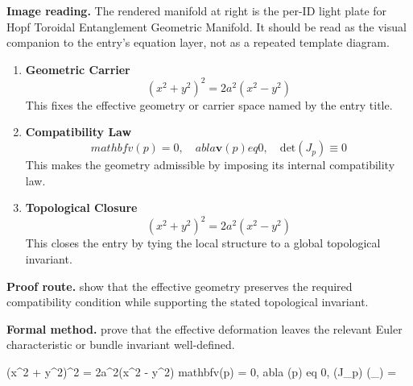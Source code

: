 \begin{samepage}
\noindent\begin{minipage}[t]{0.45\linewidth}
\vspace{0pt}
\raggedright
\scriptsize\textbf{Image reading.} The rendered manifold at right is the per-ID light plate for Hopf Toroidal Entanglement Geometric Manifold. It should be read as the visual companion to the entry's equation layer, not as a repeated template diagram.\par
\end{minipage}\hfill
\begin{minipage}[t]{0.53\linewidth}
\vspace*{-0.10in}
\raggedright
{}
\end{minipage}
\end{samepage}

\clearpage


\begin{enumerate}[leftmargin=1.6em,itemsep=9pt,topsep=6pt]
\item \textbf{Geometric Carrier}
\[
(x^2 + y^2)^2 = 2a^2(x^2 - y^2)
\]
This fixes the effective geometry or carrier space named by the entry title.

\item \textbf{Compatibility Law}
\[
mathbf{v}(p) = 0, \quad  abla \mathbf{v}(p)  eq 0, \quad \text{det}(J_p) \equiv 0
\]
This makes the geometry admissible by imposing its internal compatibility law.

\item \textbf{Topological Closure}
\[
(x^2 + y^2)^2 = 2a^2(x^2 - y^2)
\]
This closes the entry by tying the local structure to a global topological invariant.
\end{enumerate}

\textbf{Proof route.} show that the effective geometry preserves the required compatibility condition while supporting the stated topological invariant.

\textbf{Formal method.} prove that the effective deformation leaves the relevant Euler characteristic or bundle invariant well-defined.

\medskip
{}

\begin{tzpsnapshot}
\end{tzpsnapshot}

\tzpequationlinks
  {(x^2 + y^2)^2 = 2a^2(x^2 - y^2)}
  {mathbf{v}(p) = 0, \quad  abla (p)  eq 0, \quad {}(J_p) }
  {\chi(_{}) = \cdots}
